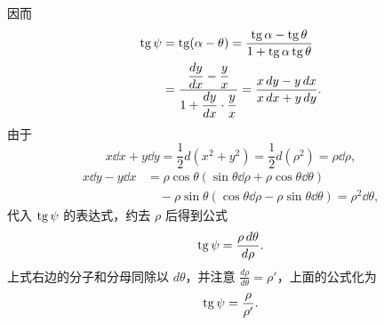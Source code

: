 \noindent 因而
\begin{align*}
  \operatorname{tg}\psi &= \operatorname{tg}(\alpha - \theta) = \frac{\operatorname{tg}\alpha - \operatorname{tg}\theta}{1 + \operatorname{tg}\alpha\operatorname{tg}\theta} \\
          &= \frac{\dfrac{dy}{dx} - \dfrac{y}{x}}{1 + \dfrac{dy}{dx}\cdot\dfrac{y}{x}} = \frac{x\,d y - y\,d x}{x\,d x + y\,d y}.
\end{align*}
由于
\[
  x\dd x + y\dd y = \frac{1}{2}d(x^2 + y^2) = \frac{1}{2}d(\rho^2) = \rho\dd\rho,
\]
\begin{align*}
  x\dd y - y\dd x &= \rho\cos\theta(\sin\theta\dd\rho + \rho\cos\theta\dd\theta) \\
                  &\quad - \rho\sin\theta(\cos\theta\dd\rho - \rho\sin\theta\dd\theta) = \rho^2\dd\theta,
\end{align*}
代入 $\operatorname{tg}\psi$ 的表达式，约去 $\rho$ 后得到公式
\[
  \operatorname{tg}\psi = \frac{\rho\,d\theta}{d\rho}.
\]
上式右边的分子和分母同除以 $d\theta$，并注意 $\frac{d\rho}{d\theta} = \rho'$，上面的公式化为
\[
  \operatorname{tg}\psi = \frac{\rho}{\rho'}.
\]

